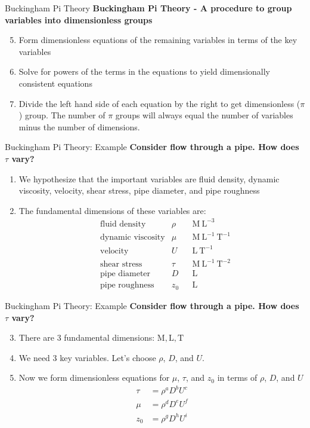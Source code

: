 \begin{frame}{Buckingham Pi Theory}
\textbf{Buckingham Pi Theory - A procedure to group variables into dimensionless groups}
\begin{enumerate}
	\setcounter{enumi}{4}
	\item Form dimensionless equations of the remaining variables in terms of the key variables
	\item Solve for powers of the terms in the equations to yield dimensionally consistent equations
	\item Divide the left hand side of each equation by the right to get dimensionless ($\pi$) group. The number of $\pi$ groups will always equal the number of variables minus the number of dimensions.
\end{enumerate}
\end{frame}
\begin{frame}{Buckingham Pi Theory: Example}
\textbf{Consider flow through a pipe. How does $\tau$ vary?}
\begin{enumerate}
	\item We hypothesize that the important variables are fluid density, dynamic viscosity, velocity, shear stress, pipe diameter, and pipe roughness
	\item The fundamental dimensions of these variables are:
	\begin{align*}
	&\text{fluid density}     & \rho & &\mathrm{M\ L^{-3}}\\
	&\text{dynamic viscosity} & \mu  & &\mathrm{M\ L^{-1}\ T^{-1}}\\
	&\text{velocity}          & U    & &\mathrm{L\ T^{-1}}\\
	&\text{shear stress}      & \tau & &\mathrm{M\ L^{-1}\ T^{-2}}\\
	&\text{pipe diameter}     & D    & &\mathrm{L}\\
	&\text{pipe roughness}    & z_0  & &\mathrm{L}
	\end{align*}
\end{enumerate}
\end{frame}
\begin{frame}{Buckingham Pi Theory: Example}
\textbf{Consider flow through a pipe. How does $\tau$ vary?}
\begin{enumerate}
\setcounter{enumi}{2}
	\item There are 3 fundamental dimensions: $\mathrm{M, L, T}$
	\item We need 3 key variables. Let's choose $\rho$, $D$, and $U$.
	\item Now we form dimensionless equations for $\mu$, $\tau$, and $z_0$ in terms of $\rho$, $D$, and $U$
	\begin{align*}
		\tau &= \rho^a D^b U^c\\
		\mu  &= \rho^d D^e U^f\\
		z_0  &= \rho^g D^h U^i\\
	\end{align*}
\end{enumerate}
\end{frame}
